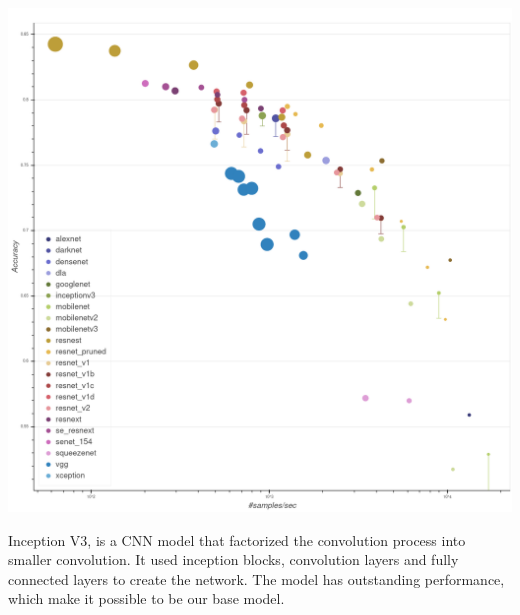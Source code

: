                     \begin{Figure}
                        \centering
                        \includegraphics[width=\linewidth]{Image/bokeh_plot.png}
                    \end{Figure}

                    Inception V3, is a CNN model that factorized the convolution process into smaller convolution\cite{szegedy2015rethinkinginceptionarchitecturecomputer}. It used inception blocks, convolution layers and fully connected layers to create the network. The model has outstanding performance, which make it possible to be our base model.

